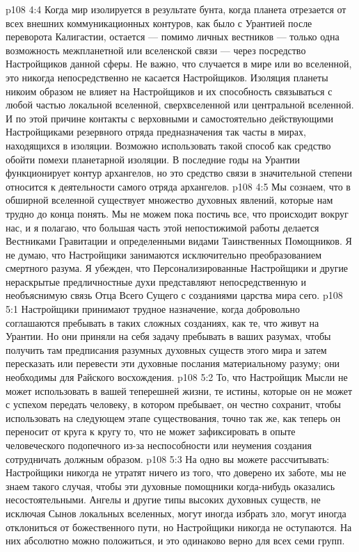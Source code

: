 \vs p108 4:4 Когда мир изолируется в результате бунта, когда планета отрезается от всех внешних коммуникационных контуров, как было с Урантией после переворота Калигастии, остается --- помимо личных вестников --- только одна возможность межпланетной или вселенской связи --- через посредство Настройщиков данной сферы. Не важно, что случается в мире или во вселенной, это никогда непосредственно не касается Настройщиков. Изоляция планеты никоим образом не влияет на Настройщиков и их способность связываться с любой частью локальной вселенной, сверхвселенной или центральной вселенной. И по этой причине контакты с верховными и самостоятельно действующими Настройщиками резервного отряда предназначения так часты в мирах, находящихся в изоляции. Возможно использовать такой способ как средство обойти помехи планетарной изоляции. В последние годы на Урантии функционирует контур архангелов, но это средство связи в значительной степени относится к деятельности самого отряда архангелов.
\vs p108 4:5 \pc Мы сознаем, что в обширной вселенной существует множество духовных явлений, которые нам трудно до конца понять. Мы не можем пока постичь все, что происходит вокруг нас, и я полагаю, что большая часть этой непостижимой работы делается Вестниками Гравитации и определенными видами Таинственных Помощников. Я не думаю, что Настройщики занимаются исключительно преобразованием смертного разума. Я убежден, что Персонализированные Настройщики и другие нераскрытые предличностные духи представляют непосредственную и необъяснимую связь Отца Всего Сущего с созданиями царства мира сего.
\vs p108 5:1 Настройщики принимают трудное назначение, когда добровольно соглашаются пребывать в таких сложных созданиях, как те, что живут на Урантии. Но они приняли на себя задачу пребывать в ваших разумах, чтобы получить там предписания разумных духовных существ этого мира и затем пересказать или перевести эти духовные послания материальному разуму; они необходимы для Райского восхождения.
\vs p108 5:2 То, что Настройщик Мысли не может использовать в вашей теперешней жизни, те истины, которые он не может с успехом передать человеку, в котором пребывает, он честно сохранит, чтобы использовать на следующем этапе существования, точно так же, как теперь он переносит от круга к кругу то, что не может зафиксировать в опыте человеческого подопечного из\hyp{}за неспособности или неумения создания сотрудничать должным образом.
\vs p108 5:3 На одно вы можете рассчитывать: Настройщики никогда не утратят ничего из того, что доверено их заботе, мы не знаем такого случая, чтобы эти духовные помощники когда\hyp{}нибудь оказались несостоятельными. Ангелы и другие типы высоких духовных существ, не исключая Сынов локальных вселенных, могут иногда избрать зло, могут иногда отклониться от божественного пути, но Настройщики никогда не оступаются. На них абсолютно можно положиться, и это одинаково верно для всех семи групп.
